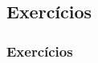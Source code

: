 \subsection[Exercícios]{Exercícios}\label{subsec:sec99-lista-2-exercicios}



\begin{frame}[t]\frametitle{Exercícios}


\end{frame}

